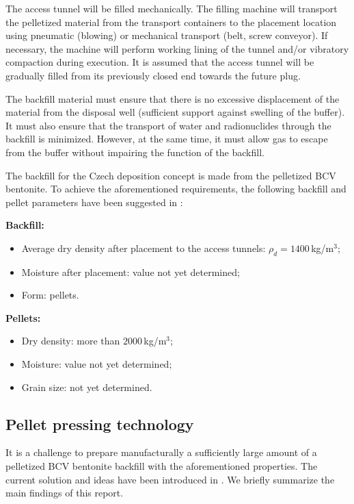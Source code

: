 The access tunnel will be filled mechanically. The filling machine will transport the pelletized material from the transport containers to the placement location using pneumatic (blowing) or mechanical transport (belt, screw conveyor). If necessary, the machine will perform working lining of the tunnel and/or vibratory compaction during execution. It is assumed that the access tunnel will be gradually filled from its previously closed end towards the future plug.

The backfill material must ensure that there is no excessive displacement of the material from the disposal well (sufficient support against swelling of the buffer). It must also ensure that the transport of water and radionuclides through the backfill is minimized. However, at the same time, it must allow gas to escape from the buffer without impairing the function of the backfill.

The backfill for the Czech deposition concept is made from the pelletized \acrshort{BCV} bentonite. To achieve the aforementioned requirements, the following backfill and pellet parameters have been suggested in \cite{Svoboda2023navrh}:

\noindent
\textbf{Backfill:}
\begin{itemize}
    \item Average dry density after placement to the access tunnels: $\rho_d=1400\,$kg/m$^3$;
    \item Moisture after placement: value not yet determined;
    \item Form: pellets.
\end{itemize}
\textbf{Pellets:}
\begin{itemize}
    \item Dry density: more than $2000\,$kg/m$^3$;
    \item Moisture: value not yet determined;
    \item Grain size: not yet determined.
\end{itemize}


\subsection{Pellet pressing technology}

It is a challenge to prepare manufacturally a sufficiently large amount of a pelletized \acrshort{BCV} bentonite backfill with the aforementioned properties. The current solution and ideas have been introduced in \cite{Stastka2020navrh}. We briefly summarize the main findings of this report.

